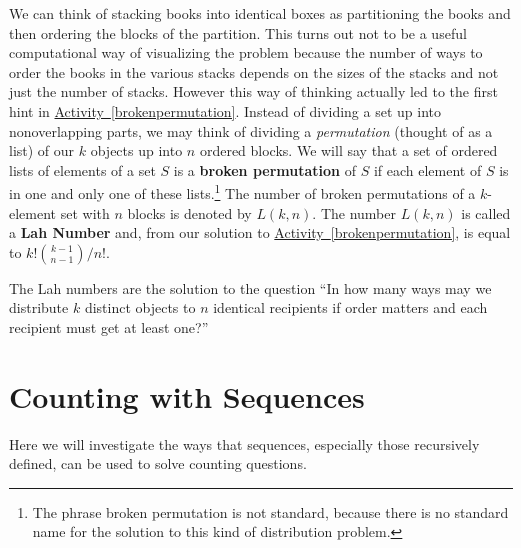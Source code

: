 \documentclass[10pt,]{book}
\newcommand{\terminology}[1]{\textbf{#1}}
\theoremstyle{plain}
\theoremstyle{definition}
\theoremstyle{definition}
\theoremstyle{definition}
\theoremstyle{definition}
\numberwithin{equation}{chapter}
\begin{document}
We can think of stacking books into identical boxes as partitioning the books and then ordering the blocks of the partition. This turns out not to be a useful computational way of visualizing the problem because the number of ways to order the books in the various stacks depends on the sizes of the stacks and not just the number of stacks. However this way of thinking actually led to the first hint in \hyperref[brokenpermutation]{Activity~\ref{brokenpermutation}}. Instead of dividing a set up into nonoverlapping parts, we may think of dividing a \emph{permutation} (thought of as a list) of our \(k\) objects up into \(n\) ordered blocks. We will say that a set of ordered lists of elements of a set \(S\) is a \terminology{broken permutation}   of \(S\) if each element of \(S\) is in one and only one of these lists.\footnote{The phrase broken permutation is not standard, because there is no standard name for the solution to this kind  of distribution problem.\label{fn-7}} The number of broken permutations of a \(k\)-element set with \(n\) blocks is denoted by \(L(k,n)\). The number \(L(k,n)\) is called a \terminology{Lah Number} and, from our solution to \hyperref[brokenpermutation]{Activity~\ref{brokenpermutation}}, is equal to \(k!\binom{k-1}{n-1}/n!\).%
\par
\hypertarget{p-783}{}%
The Lah numbers are the solution to the question ``In how many ways may we distribute \(k\) distinct objects to \(n\) identical recipients if order matters and each recipient must get at least one?''%
\typeout{************************************************}
\typeout{************************************************}
\section[{Counting with Sequences}]{Counting with Sequences}\label{sec_basic-sequences}
\hypertarget{p-784}{}%
Here we will investigate the ways that sequences, especially those recursively defined, can be used to solve counting questions.%
\typeout{************************************************}
\typeout{************************************************}
\end{document}

